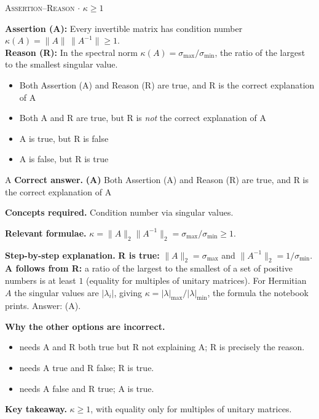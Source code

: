\documentclass[11pt,a4paper]{article}
\newcommand{\optlabel}[1]{\textbf{(#1)}}
\newcommand{\correctlabel}[1]{\textcolor{okgreen}{\textbf{(#1)}\,\ding{51}}}
\newenvironment{qitem}[1]{\begin{list}{}{\setlength{\leftmargin}{3.3em}\setlength{\labelwidth}{3.1em}%
  \setlength{\labelsep}{0.2em}\setlength{\topsep}{3pt}\setlength{\parsep}{3pt}}\item[\textbf{Q.#1}\hfill]}{\end{list}}
\newcommand{\qsep}{\par\vspace{2pt}{\color{black!15}\hrule}\vspace{4pt}}
\newcommand{\qmeta}[2]{{\footnotesize\color{black!60}\textsc{#1} \;$\cdot$\; #2}\par}
\begin{document}
\begin{qitem}{7}
\qmeta{Assertion--Reason}{$\kappa \ge 1$}
\textbf{Assertion (A):} Every invertible matrix has condition number $\kappa(A) = \|A\|\,\|A^{-1}\| \ge 1$.\\[1mm]
\textbf{Reason (R):} In the spectral norm $\kappa(A) = \sigma_{\max}/\sigma_{\min}$, the ratio of the largest to the smallest singular value.
\begin{itemize}[leftmargin=2.6em, labelsep=0.4em, itemsep=2pt, topsep=3pt]
\item[\correctlabel{A}] Both Assertion (A) and Reason (R) are true, and R is the correct explanation of A
\item[\optlabel{B}] Both A and R are true, but R is \emph{not} the correct explanation of A
\item[\optlabel{C}] A is true, but R is false
\item[\optlabel{D}] A is false, but R is true
\end{itemize}
\end{qitem}
\begin{solbox}{A}
\textbf{\color{brand}Correct answer.} \textcolor{okgreen}{\textbf{(A)}} Both Assertion (A) and Reason (R) are true, and R is the correct explanation of A

\textbf{\color{brand}Concepts required.} Condition number via singular values.

\textbf{\color{brand}Relevant formulae.} $\kappa = \|A\|_2\|A^{-1}\|_2 = \sigma_{\max}/\sigma_{\min} \ge 1$.

\textbf{\color{brand}Step-by-step explanation.} \textbf{R is true:} $\|A\|_2 = \sigma_{\max}$ and $\|A^{-1}\|_2 = 1/\sigma_{\min}$.
\textbf{A follows from R:} a ratio of the largest to the smallest of a set of positive numbers is at least $1$ (equality for multiples of unitary
matrices). For Hermitian $A$ the singular values are $|\lambda_i|$, giving $\kappa = |\lambda|_{\max}/|\lambda|_{\min}$, the formula the notebook prints. Answer: (A).

\textbf{\color{brand}Why the other options are incorrect.}
\begin{itemize}[leftmargin=2.4em, itemsep=1pt, topsep=2pt]
\item[\textbf{(B)}] needs A and R both true but R not explaining A; R is precisely the reason.
\item[\textbf{(C)}] needs A true and R false; R is true.
\item[\textbf{(D)}] needs A false and R true; A is true.
\end{itemize}
\textbf{\color{brand}Key takeaway.} $\kappa \ge 1$, with equality only for multiples of unitary matrices.
\end{solbox}
\qsep
\end{document}
